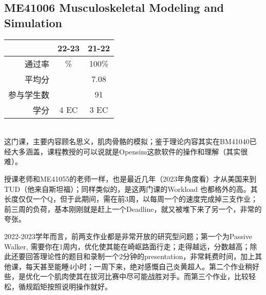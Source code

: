 \subsection{ME41006 Musculoskeletal Modeling and Simulation}
\begin{minipage}{0.45\textwidth}
\centering
{}
\end{minipage}%
\begin{minipage}{0.45\textwidth}
\raggedleft
\begin{tabular}{r|c|c}
\textbf{ } & \textbf{22-23} & \textbf{21-22}\\ \hline
通过率 & \% & 100\%\\ 
平均分 &   & 7.08\\ 
参与学生数 &  & 91\\
学分 & 4 EC & 3 EC\\
\end{tabular}
\end{minipage}\\

这门课，主要内容顾名思义，肌肉骨骼的模拟；鉴于理论内容其实在BM41040已经大多涵盖，课程教授的可以说就是Opensim这款软件的操作和理解（其实很难）。

授课老师和ME41055的老师一样，也是最近几年（2023年角度看）才从美国来到TUD（他来自斯坦福）；同样类似的，是这两门课的Workload 也都格外的高。其长度仅仅一个Q，但于此期间，需在前3周，以每周一个的速度完成掉三支作业；前三周的负荷，基本刚刚就是赶上一个Deadline，就又被堆下来了另一个，非常的夸张。

2022-2023学年而言，前两支作业都是非常开放的研究型问题；第一个为Passive Walker, 需要你在1周内，优化使其能在崎岖路面行走；走得越远，分数越高；除此还要回答理论性的题目和录制一个2分钟的presentation，非常耗费时间，加上其他课，每天甚至能睡4小时；一周下来，绝对感慨自己炎黄超人。第二个作业稍好些，是优化一个肌肉使其在拔河比赛中尽可能战胜对手。而第三个作业，比较轻松，循规蹈矩按照说明操作就好。

